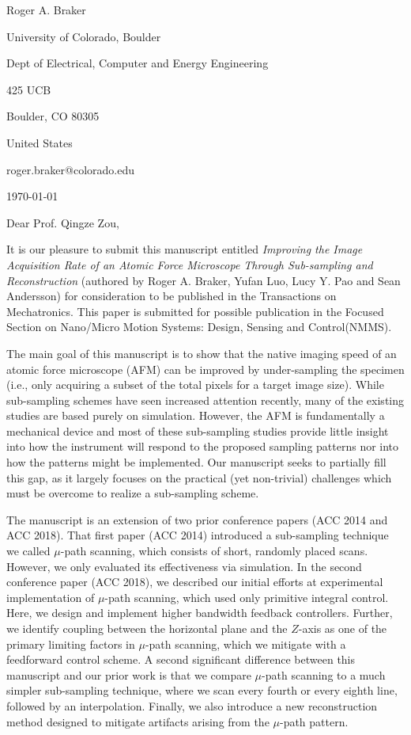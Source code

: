 \documentclass[a4paper,twoside]{article}
\begin{document}
\hspace*{0.45\linewidth}
\begin{minipage}{0.52\linewidth}
Roger A. Braker\par
University of Colorado, Boulder\par
Dept of Electrical, Computer and Energy Engineering \par
425 UCB\par
Boulder, CO 80305\par
United States\par
roger.braker@colorado.edu\par
\today
\end{minipage}
\par\bigskip

Dear Prof. Qingze Zou,\par\bigskip

It is our pleasure to submit this manuscript entitled \textit{Improving the Image Acquisition Rate of an Atomic Force Microscope Through Sub-sampling and Reconstruction} (authored by Roger A. Braker, Yufan Luo, Lucy Y. Pao and Sean Andersson) for consideration to be published in the Transactions on Mechatronics. This paper is submitted for possible publication in the Focused Section on Nano/Micro Motion  Systems:  Design,  Sensing  and  Control(NMMS).

The main goal of this manuscript is to show that the native imaging speed of an atomic force microscope (AFM) can be improved by under-sampling the specimen (i.e., only acquiring a subset of the total pixels for a target image size). While sub-sampling schemes have seen increased attention recently, many of the existing studies are based purely on simulation. However, the AFM is fundamentally a mechanical device and most of these sub-sampling studies provide little insight
into how the instrument will respond to the proposed sampling patterns nor into how the patterns might be implemented. Our manuscript seeks to partially fill this gap, as it largely focuses on the practical (yet non-trivial) challenges which must be overcome to realize a sub-sampling scheme. 

The manuscript is an extension of two prior conference papers (ACC 2014 and ACC 2018). That first paper (ACC 2014) introduced a sub-sampling technique we called $\mu$-path scanning, which consists of short, randomly placed scans. However, we only evaluated its effectiveness via simulation. In the second conference paper (ACC 2018), we described our initial efforts at experimental implementation of $\mu$-path scanning, which used only primitive integral control. Here, we design and implement higher bandwidth feedback controllers. Further, we identify coupling between the horizontal plane and the $Z$-axis as one of the primary limiting factors in $\mu$-path scanning, which we mitigate with a feedforward control scheme. A second significant difference between this manuscript and our prior work is that we compare $\mu$-path scanning to a much simpler sub-sampling technique, where we scan every fourth or every eighth line, followed by an interpolation. Finally, we also introduce a new reconstruction method designed to mitigate artifacts arising from the $\mu$-path pattern.
\end{document}
